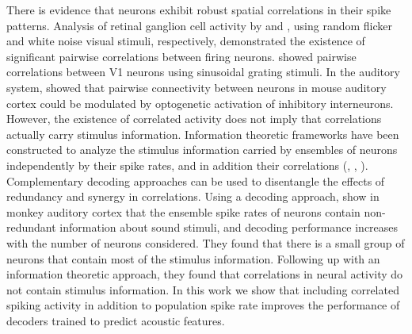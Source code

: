 There is evidence that neurons exhibit robust spatial correlations in their spike patterns. Analysis of retinal ganglion cell activity by \cite{Schlens2006} and \cite{Schneidman2006}, using random flicker and white noise visual stimuli, respectively, demonstrated the existence of significant pairwise correlations between firing neurons. \cite{Denman2014} showed pairwise correlations between V1 neurons using sinusoidal grating stimuli. In the auditory system, \cite{Hamilton2013} showed that pairwise connectivity between neurons in mouse auditory cortex could be modulated by optogenetic activation of inhibitory interneurons. However, the existence of correlated activity does not imply that correlations actually carry stimulus information. Information theoretic frameworks have been constructed to analyze the stimulus information carried by ensembles of neurons independently by their spike rates, and in addition their correlations (\cite{Panzeri2001}, \cite{Schneidman2003}, \cite{Nirenberg2003}). Complementary decoding approaches can be used to disentangle the effects of redundancy and synergy in correlations. Using a decoding approach, \cite{Ince2013} show in monkey auditory cortex that the ensemble spike rates of neurons contain non-redundant information about sound stimuli, and decoding performance increases with the number of neurons considered. They found that there is a small group of neurons that contain most of the stimulus information. Following up with an information theoretic approach, they found that correlations in neural activity do not contain stimulus information. In this work we show that including correlated spiking activity in addition to population spike rate improves the performance of decoders trained to predict acoustic features.
